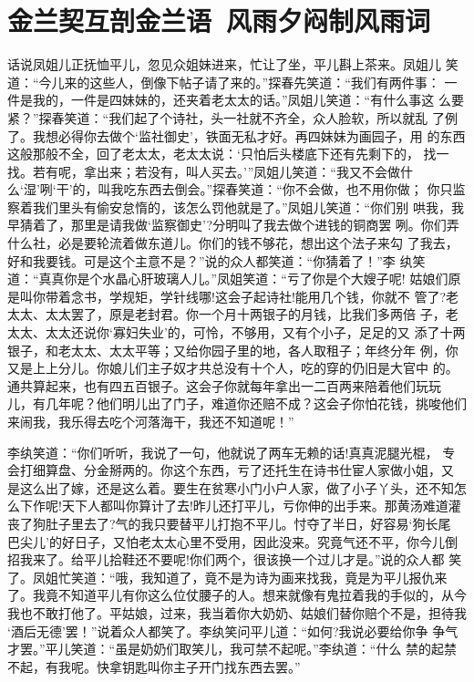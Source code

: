 \chapter{金兰契互剖金兰语~风雨夕闷制风雨词}

话说凤姐儿正抚恤平儿，忽见众姐妹进来，忙让了坐，平儿斟上茶来。凤姐儿
笑道：“今儿来的这些人，倒像下帖子请了来的。”探春先笑道：“我们有两件事：
一件是我的，一件是四妹妹的，还夹着老太太的话。”凤姐儿笑道：“有什么事这
么要紧？”探春笑道：“我们起了个诗社，头一社就不齐全，众人脸软，所以就乱
了例了。我想必得你去做个‘监社御史’，铁面无私才好。再四妹妹为画园子，用
的东西这般那般不全，回了老太太，老太太说：‘只怕后头楼底下还有先剩下的，
找一找。若有呢，拿出来；若没有，叫人买去。’”凤姐儿笑道：“我又不会做什
么‘湿’咧‘干’的，叫我吃东西去倒会。”探春笑道：“你不会做，也不用你做；
你只监察着我们里头有偷安怠惰的，该怎么罚他就是了。”凤姐儿笑道：“你们别
哄我，我早猜着了，那里是请我做‘监察御史’?分明叫了我去做个进钱的铜商罢
咧。你们弄什么社，必是要轮流着做东道儿。你们的钱不够花，想出这个法子来勾
了我去，好和我要钱。可是这个主意不是？”说的众人都笑道：“你猜着了！”李
纨笑道：“真真你是个水晶心肝玻璃人儿。”凤姐笑道：“亏了你是个大嫂子呢!
姑娘们原是叫你带着念书，学规矩，学针线哪!这会子起诗社!能用几个钱，你就不
管了?老太太、太太罢了，原是老封君。你一个月十两银子的月钱，比我们多两倍
子，老太太、太太还说你‘寡妇失业’的，可怜，不够用，又有个小子，足足的又
添了十两银子，和老太太、太太平等；又给你园子里的地，各人取租子；年终分年
例，你又是上上分儿。你娘儿们主子奴才共总没有十个人，吃的穿的仍旧是大官中
的。通共算起来，也有四五百银子。这会子你就每年拿出一二百两来陪着他们玩玩
儿，有几年呢？他们明儿出了门子，难道你还赔不成？这会子你怕花钱，挑唆他们
来闹我，我乐得去吃个河落海干，我还不知道呢！”

李纨笑道：“你们听听，我说了一句，他就说了两车无赖的话!真真泥腿光棍，
专会打细算盘、分金掰两的。你这个东西，亏了还托生在诗书仕宦人家做小姐，又
是这么出了嫁，还是这么着。要生在贫寒小门小户人家，做了小子丫头，还不知怎
么下作呢!天下人都叫你算计了去!昨儿还打平儿，亏你伸的出手来。那黄汤难道灌
丧了狗肚子里去了?气的我只要替平儿打抱不平儿。忖夺了半日，好容易‘狗长尾
巴尖儿’的好日子，又怕老太太心里不受用，因此没来。究竟气还不平，你今儿倒
招我来了。给平儿拾鞋还不要呢!你们两个，很该换一个过儿才是。”说的众人都
笑了。凤姐忙笑道：“哦，我知道了，竟不是为诗为画来找我，竟是为平儿报仇来
了。我竟不知道平儿有你这么位仗腰子的人。想来就像有鬼拉着我的手似的，从今
我也不敢打他了。平姑娘，过来，我当着你大奶奶、姑娘们替你赔个不是，担待我
‘酒后无德’罢！”说着众人都笑了。李纨笑问平儿道：“如何?我说必要给你争
争气才罢。”平儿笑道：“虽是奶奶们取笑儿，我可禁不起呢。”李纨道：“什么
禁的起禁不起，有我呢。快拿钥匙叫你主子开门找东西去罢。”

